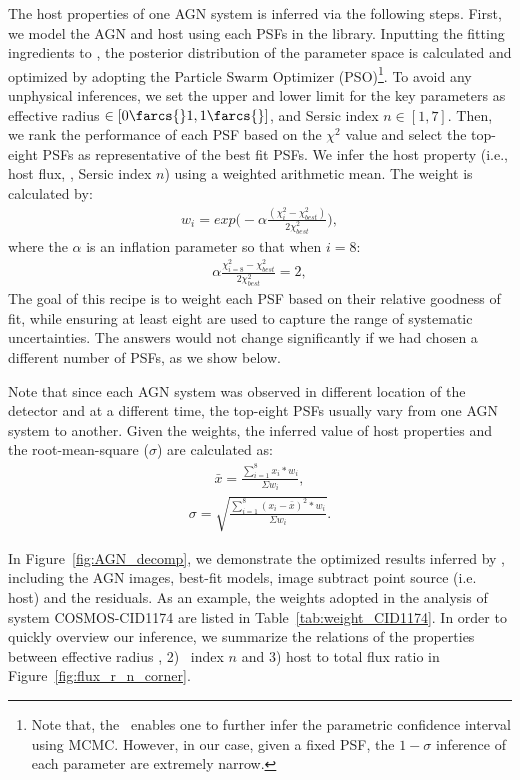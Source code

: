 \documentclass[apj]{emulateapj}
\begin{document}
The host properties of one AGN system is inferred via the following steps. First, we model the AGN and host using each PSFs in the library. Inputting the fitting ingredients to \lenstronomy, the posterior distribution of the parameter space is calculated and optimized by adopting the Particle Swarm Optimizer (PSO)\footnote{Note that, the \lenstronomy\ enables one to further infer the parametric confidence interval using MCMC. However, in our case, given a fixed PSF, the $1-\sigma$ inference of each parameter are extremely narrow.}.
To avoid any unphysical inferences, we set the upper and lower limit for the key parameters as effective radius \Reff$\in[0\farcs{}1,1\farcs{}]$, and Sersic index $n\in[1,7]$. Then, we rank the performance of each PSF based on the $\chi^2$ value and select the top-eight PSFs as representative of the best fit PSFs. We infer the host property (i.e., host flux, \Reff, Sersic index $n$) using a weighted arithmetic mean. The weight is calculated by:
\begin{eqnarray}
\label{eq:weights}
w_i = exp \big(- \alpha \frac{ (\chi_i ^2 - \chi_{best} ^2 )}{2 \chi_{best} ^2} \big),
\end{eqnarray} 
where the $\alpha$ is an inflation parameter so that when $i=8$:
\begin{eqnarray}
\label{eq:alpha}
\alpha \frac{ \chi_{i=8} ^2 - \chi_{best} ^2 }{2 \chi_{best} ^2} = 2,
\end{eqnarray} 
The goal of this recipe is to weight each PSF based on their relative goodness of fit, while ensuring at least eight are used to capture the range of systematic uncertainties. The answers would not change significantly if we had chosen a different number of PSFs, as we show below.

Note that since each AGN system was observed in different location of the detector and at a different time, the top-eight PSFs usually vary from one AGN system to another. Given the weights, the inferred value of host properties and the root-mean-square ($\sigma$) are calculated as:
\begin{eqnarray}
\label{eq:infer_value}
\bar{x}  =  \frac{  \sum_{i=1}^{8}   x_i * w_i  }{\Sigma w_i} ,
\end{eqnarray} 
\begin{eqnarray}
\sigma =   \sqrt{ \frac{  \sum_{i=1}^{8}   (x_i -  \bar{x} ) ^2 * w_i  }{\Sigma w_i} }.
\end{eqnarray} 

In Figure~\ref{fig:AGN_decomp}, we demonstrate the optimized results inferred by \lenstronomy, including the AGN images, best-fit models, image subtract point source (i.e. host) and the residuals. As an example, the weights adopted in the analysis of system COSMOS-CID1174 are listed in Table~\ref{tab:weight_CID1174}. In order to quickly overview our inference, we summarize the relations of the properties between effective radius \Reff, 2) \sersic\ index $n$ and 3) host to total flux ratio in Figure~\ref{fig:flux_r_n_corner}.
\end{document}
